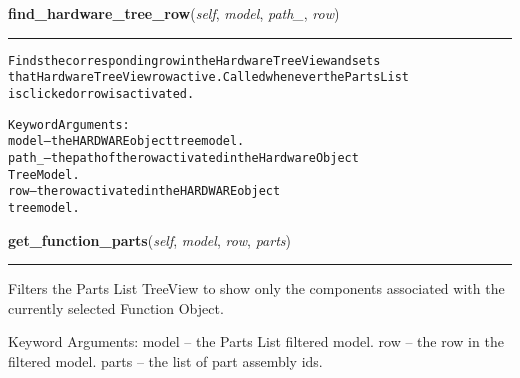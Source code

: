     \label{reliafree:partlist:PartsListWindow:find_hardware_tree_row}

    \vspace{0.5ex}

\hspace{.8\funcindent}\begin{boxedminipage}{\funcwidth}

    \raggedright \textbf{find\_hardware\_tree\_row}(\textit{self}, \textit{model}, \textit{path\_}, \textit{row})

    \vspace{-1.5ex}

    \rule{\textwidth}{0.5\fboxrule}
\setlength{\parskip}{2ex}
\begin{alltt}
Finds the corresponding row in the Hardware TreeView and sets
that Hardware TreeView row active.  Called whenever the Parts List
is clicked or row is activated.

Keyword Arguments:
model -- the HARDWARE object tree model.
path\_ -- the path of the row activated in the Hardware Object
         TreeModel.
row   -- the row activated in the HARDWARE object
         tree model.
\end{alltt}

\setlength{\parskip}{1ex}
    \end{boxedminipage}

    \label{reliafree:partlist:PartsListWindow:get_function_parts}

    \vspace{0.5ex}

\hspace{.8\funcindent}\begin{boxedminipage}{\funcwidth}

    \raggedright \textbf{get\_function\_parts}(\textit{self}, \textit{model}, \textit{row}, \textit{parts})

    \vspace{-1.5ex}

    \rule{\textwidth}{0.5\fboxrule}
\setlength{\parskip}{2ex}
    Filters the Parts List TreeView to show only the components associated 
    with the currently selected Function Object.

    Keyword Arguments: model -- the Parts List filtered model. row   -- the
    row in the filtered model. parts -- the list of part assembly ids.

\setlength{\parskip}{1ex}
    \end{boxedminipage}

